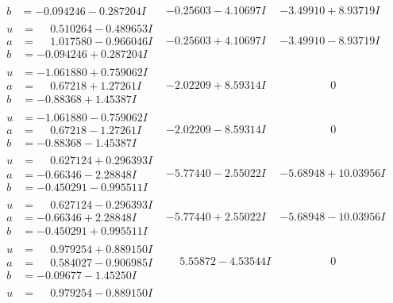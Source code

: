 \documentclass[1p]{elsarticle_modified}
\theoremstyle{definition}
\begin{document}
$$\begin{array}{c|c|c}
\begin{aligned}
b &= -0.094246 - 0.287204 I\end{aligned}
 & -0.25603 - 4.10697 I & -3.49910 + 8.93719 I \\ \hline\begin{aligned}
u &= \phantom{-}0.510264 - 0.489653 I \\
a &= \phantom{-}1.017580 - 0.966046 I \\
b &= -0.094246 + 0.287204 I\end{aligned}
 & -0.25603 + 4.10697 I & -3.49910 - 8.93719 I \\ \hline\begin{aligned}
u &= -1.061880 + 0.759062 I \\
a &= \phantom{-}0.67218 + 1.27261 I \\
b &= -0.88368 + 1.45387 I\end{aligned}
 & -2.02209 + 8.59314 I & \phantom{-0.000000 } 0 \\ \hline\begin{aligned}
u &= -1.061880 - 0.759062 I \\
a &= \phantom{-}0.67218 - 1.27261 I \\
b &= -0.88368 - 1.45387 I\end{aligned}
 & -2.02209 - 8.59314 I & \phantom{-0.000000 } 0 \\ \hline\begin{aligned}
u &= \phantom{-}0.627124 + 0.296393 I \\
a &= -0.66346 - 2.28848 I \\
b &= -0.450291 - 0.995511 I\end{aligned}
 & -5.77440 - 2.55022 I & -5.68948 + 10.03956 I \\ \hline\begin{aligned}
u &= \phantom{-}0.627124 - 0.296393 I \\
a &= -0.66346 + 2.28848 I \\
b &= -0.450291 + 0.995511 I\end{aligned}
 & -5.77440 + 2.55022 I & -5.68948 - 10.03956 I \\ \hline\begin{aligned}
u &= \phantom{-}0.979254 + 0.889150 I \\
a &= \phantom{-}0.584027 - 0.906985 I \\
b &= -0.09677 - 1.45250 I\end{aligned}
 & \phantom{-}5.55872 - 4.53544 I & \phantom{-0.000000 } 0 \\ \hline\begin{aligned}
u &= \phantom{-}0.979254 - 0.889150 I \\

\end{aligned}
\end{array}$$
\end{document}

